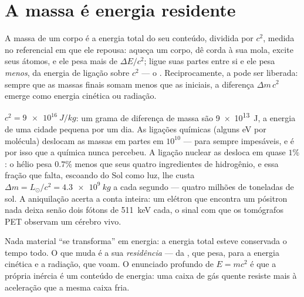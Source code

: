 \section{A massa é energia residente}

\begin{theorem}\label{thm:b3:relativistic-dynamics:emc2}
A massa de um corpo é a energia total do seu conteúdo, dividida por
$c^2$, medida no referencial em que ele repousa: aqueça um corpo, dê
corda à sua mola, excite seus átomos, e ele pesa mais de $\Delta E/c^2$;
ligue suas partes entre si e ele pesa \emph{menos}, da energia de
ligação sobre $c^2$ --- o \emph{}. Reciprocamente, a
 pode ser liberada: sempre que as massas finais somam
menos que as iniciais, a diferença $\Delta m\,c^2$ emerge como energia
cinética ou radiação.
\end{theorem}
\admitted

\begin{example}[O balanço de $c^2$]\label{ex:b3:relativistic-dynamics:ledger}
$c^2 = \qty{9e16}{J/kg}$: um grama de diferença de massa são
\qty{9e13}{J}, a energia de uma cidade pequena por um dia. As ligações
químicas (alguns eV por molécula) deslocam as massas em partes em
$10^{10}$ --- para sempre impesáveis, e é por isso que a química nunca
percebeu. A ligação nuclear as desloca em quase $1\%$: o hélio pesa
$0.7\%$ menos que seus quatro ingredientes de hidrogênio, e essa fração
que falta, escoando do Sol como luz, lhe custa $\Delta m = L_\odot/c^2 =
\qty{4.3e9}{kg}$ a cada segundo --- quatro milhões de toneladas de sol.
A aniquilação acerta a conta inteira: um elétron que encontra um
pósitron nada deixa senão dois fótons de \qty{511}{keV} cada, o sinal
com que os tomógrafos PET observam um cérebro vivo.
\end{example}

\begin{remark}\label{rem:b3:relativistic-dynamics:conversion}
Nada material ``se transforma'' em energia: a energia total esteve
conservada o tempo todo. O que muda é a sua \emph{residência} --- da
, que pesa, para a energia cinética e a radiação, que
voam. O enunciado profundo de $E = mc^2$ é que a própria inércia é um
conteúdo de energia: uma caixa de gás quente resiste mais à aceleração
que a mesma caixa fria.
\end{remark}

